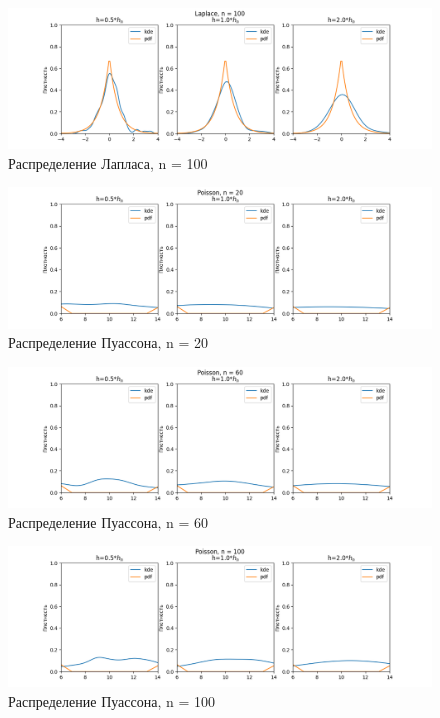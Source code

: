 \documentclass[12pt]{article}
\begin{document}
\begin{figure}
  \centering
  \includegraphics[width=0.8\paperwidth ]{../images/kde/Laplace_100.png}
  \caption{Распределение Лапласа, n = 100}
\end{figure}

\begin{figure}
  \centering
  \includegraphics[width=0.8\paperwidth ]{../images/kde/Poisson_20.png}
  \caption{Распределение Пуассона, n = 20}
\end{figure}

\begin{figure}
  \centering
  \includegraphics[width=0.8\paperwidth ]{../images/kde/Poisson_60.png}
  \caption{Распределение Пуассона, n = 60}
\end{figure}

\begin{figure}
  \centering
  \includegraphics[width=0.8\paperwidth ]{../images/kde/Poisson_100.png}
  \caption{Распределение Пуассона, n = 100}
\end{figure}
\end{document}
